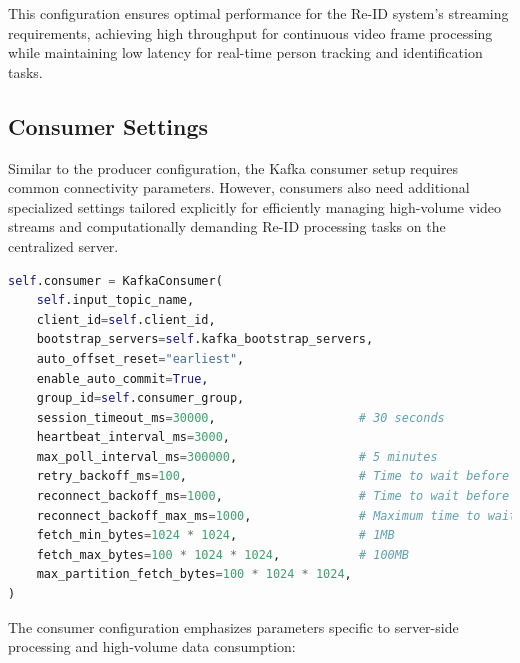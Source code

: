 \documentclass[../main.tex]{subfiles}
\begin{document}
This configuration ensures optimal performance for the Re-ID system's streaming requirements, achieving high throughput for continuous video frame processing while maintaining low latency for real-time person tracking and identification tasks.

\subsection{Consumer Settings}

Similar to the producer configuration, the Kafka consumer setup requires common connectivity parameters. However, consumers also need additional specialized settings tailored explicitly for efficiently managing high-volume video streams and computationally demanding Re-ID processing tasks on the centralized server.\\



\begin{lstlisting}[language=Python, caption={Kafka consumer configuration for centralized server}]
self.consumer = KafkaConsumer(
    self.input_topic_name,
    client_id=self.client_id,
    bootstrap_servers=self.kafka_bootstrap_servers,
    auto_offset_reset="earliest",
    enable_auto_commit=True,
    group_id=self.consumer_group,
    session_timeout_ms=30000,                    # 30 seconds
    heartbeat_interval_ms=3000,
    max_poll_interval_ms=300000,                 # 5 minutes
    retry_backoff_ms=100,                        # Time to wait before retrying
    reconnect_backoff_ms=1000,                   # Time to wait before reconnecting
    reconnect_backoff_max_ms=1000,               # Maximum time to wait before reconnecting
    fetch_min_bytes=1024 * 1024,                 # 1MB
    fetch_max_bytes=100 * 1024 * 1024,           # 100MB
    max_partition_fetch_bytes=100 * 1024 * 1024,
)
\end{lstlisting}

The consumer configuration emphasizes parameters specific to server-side processing and high-volume data consumption:
\end{document}
